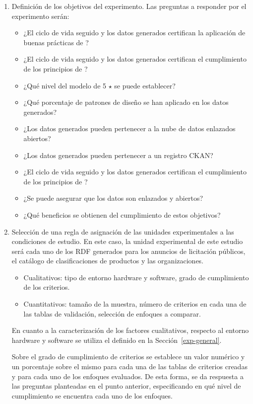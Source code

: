 \begin{enumerate}
 \item Definición de los objetivos del experimento. Las preguntas a responder por el experimento serán:
\begin{itemize}
 \item ¿El ciclo de vida seguido y los datos generados certifican la aplicación de buenas prácticas de \linkeddata?
 \item ¿El ciclo de vida seguido y los datos generados certifican el cumplimiento de los principios de \linkeddata?
 \item ¿Qué nivel del modelo de 5 $\star$ se puede establecer?
 \item ¿Qué porcentaje de patrones de diseño se han aplicado en los datos generados?
 \item ¿Los datos generados pueden pertenecer a la nube de datos enlazados abiertos?
 \item ¿Los datos generados pueden pertenecer a un registro CKAN? 
 \item ¿El ciclo de vida seguido y los datos generados certifican el cumplimiento de los principios de \opendata?
 \item ¿Se puede asegurar que los datos son enlazados y abiertos?
 \item ¿Qué beneficios se obtienen del cumplimiento de estos objetivos?
\end{itemize}

\item Selección de una regla de asignación de las unidades experimentales a las condiciones de estudio. En este caso, 
la unidad experimental de este estudio será cada uno de los \dataset \gls{RDF} generados para los anuncios de licitación públicos, 
el catálogo de clasificaciones de productos y las organizaciones.
\begin{itemize}
 \item Cualitativos: tipo de entorno hardware y software, grado de cumplimiento de los criterios.
 \item Cuantitativos: tamaño de la muestra, número de criterios en cada una de las tablas de validación, selección 
de enfoques a comparar.
\end{itemize}

En cuanto a la caracterización de los factores cualitativos, respecto al entorno hardware y 
software se utiliza el definido en la Sección~\ref{exp-general}. 

Sobre el grado de cumplimiento de criterios se establece un valor numérico y un porcentaje sobre el mismo 
para cada una de las tablas de criterios creadas y para cada uno de los enfoques evaluados. De esta forma, se da respuesta 
a las preguntas planteadas en el punto anterior, especificando en qué nivel de cumplimiento se encuentra cada uno de los 
enfoques.


\end{enumerate}
